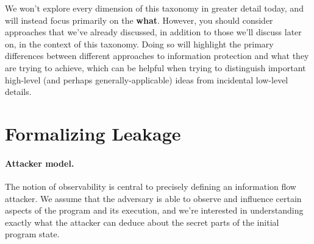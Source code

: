 \documentclass[11pt,twoside]{scrartcl}
\begin{document}
We won't explore every dimension of this taxonomy in greater detail today, and will instead focus primarily on the \textbf{what}. However, you should consider approaches that we've already discussed, in addition to those we'll discuss later on, in the context of this taxonomy. Doing so will highlight the primary differences between different approaches to information protection and what they are trying to achieve, which can be helpful when trying to distinguish important high-level (and perhaps generally-applicable) ideas from incidental low-level details.

\section{Formalizing Leakage}

\paragraph{Attacker model.}
The notion of observability is central to precisely defining an information flow attacker. We assume that the adversary is able to observe and influence certain aspects of the program and its execution, and we're interested in understanding exactly what the attacker can deduce about the secret parts of the initial program state.
\end{document}
